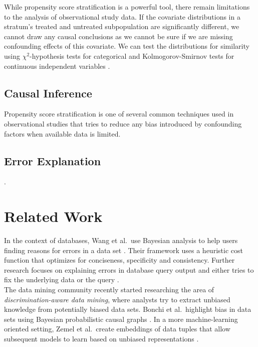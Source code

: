 \documentclass[acmsmall, nonacm, screen]{acmart} %
\begin{document}
While propensity score stratification is a powerful tool, there remain limitations to the analysis of observational study data. 
If the covariate distributions in a stratum's treated and untreated subpopulation are significantly different, we cannot draw any causal conclusions as we cannot be sure if we are missing confounding effects of this covariate.
We can test the distributions for similarity using $\chi^2$-hypothesis tests for categorical and Kolmogorov-Smirnov tests for continuous independent variables \cite{Sekhon08}.

\subsection{Causal Inference}

Propensity score stratification \cite{Austin11} is one of several common techniques used in observational studies that tries to reduce any bias introduced by confounding factors when available data is limited.\\

\subsection{Error Explanation}

.\\


\section{Related Work}
In the context of databases, Wang et al.\ use Bayesian analysis to help users finding reasons for errors in a data set \cite{Wang15}. 
Their framework uses a heuristic cost function that optimizes for conciseness, specificity and consistency. Further research focuses on explaining errors in database query output and either tries to fix the underlying data \cite{Wu13} or the query \cite{Tran10}.\\

The data mining community recently started researching the area of \textit{discrimination-aware data mining}, where analysts try to extract unbiased knowledge from potentially biased data sets. Bonchi et al.\ highlight bias in data sets using Bayesian probabilistic causal graphs \cite{Bonchi2017}. In a more machine-learning oriented setting, Zemel et al.\ create embeddings of data tuples that allow subsequent models to learn based on unbiased representations \cite{Zemel13}.\\
\end{document}
